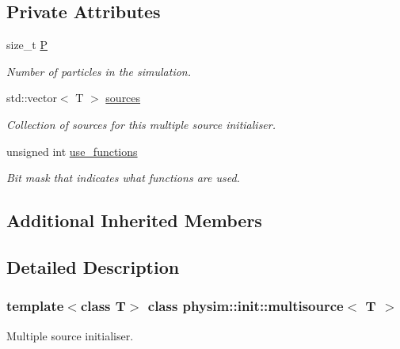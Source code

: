 \subsection*{Private Attributes}
\begin{DoxyCompactItemize}
\item 
\mbox{\label{classphysim_1_1init_1_1multisource_a341e8edbb35cc2514c6009014ec3e6e3}} 
size\+\_\+t \hyperlink{classphysim_1_1init_1_1multisource_a341e8edbb35cc2514c6009014ec3e6e3}{P}
\begin{DoxyCompactList}\small\item\em Number of particles in the simulation. \end{DoxyCompactList}\item 
\mbox{\label{classphysim_1_1init_1_1multisource_ad16d3a372efb23d3975df960a54f4dc1}} 
std\+::vector$<$ T $>$ \hyperlink{classphysim_1_1init_1_1multisource_ad16d3a372efb23d3975df960a54f4dc1}{sources}
\begin{DoxyCompactList}\small\item\em Collection of sources for this multiple source initialiser. \end{DoxyCompactList}\item 
unsigned int \hyperlink{classphysim_1_1init_1_1multisource_a12caae3f36b17cd343065aab62b62a8c}{use\+\_\+functions}
\begin{DoxyCompactList}\small\item\em Bit mask that indicates what functions are used. \end{DoxyCompactList}\end{DoxyCompactItemize}
\subsection*{Additional Inherited Members}


\subsection{Detailed Description}
\subsubsection*{template$<$class T$>$\newline
class physim\+::init\+::multisource$<$ T $>$}

Multiple source initialiser. 

